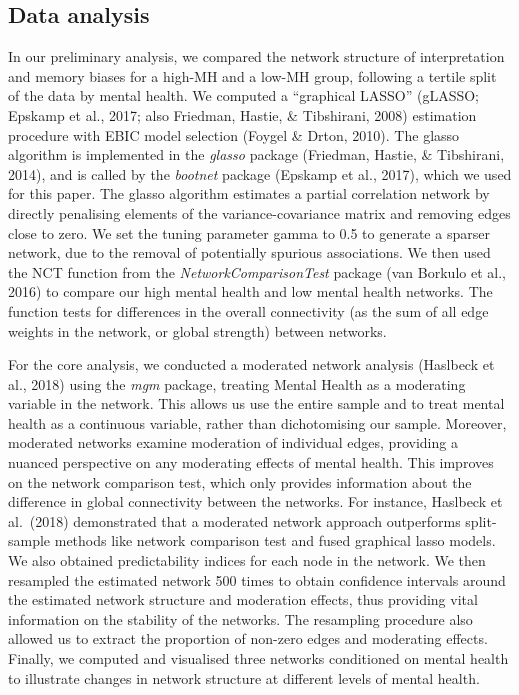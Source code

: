 \documentclass[man,floatsintext]{apa6}
\begin{document}
\hypertarget{data-analysis}{%
\subsection{Data analysis}\label{data-analysis}}

In our preliminary analysis, we compared the network structure of interpretation and memory biases for a high-MH and a low-MH group, following a tertile split of the data by mental health. We computed a \enquote{graphical LASSO} (gLASSO; Epskamp et al., 2017; also Friedman, Hastie, \& Tibshirani, 2008) estimation procedure with EBIC model selection (Foygel \& Drton, 2010). The glasso algorithm is implemented in the \emph{glasso} package (Friedman, Hastie, \& Tibshirani, 2014), and is called by the \emph{bootnet} package (Epskamp et al., 2017), which we used for this paper. The glasso algorithm estimates a partial correlation network by directly penalising elements of the variance-covariance matrix and removing edges close to zero. We set the tuning parameter gamma to 0.5 to generate a sparser network, due to the removal of potentially spurious associations. We then used the NCT function from the \emph{NetworkComparisonTest} package (van Borkulo et al., 2016) to compare our high mental health and low mental health networks. The function tests for differences in the overall connectivity (as the sum of all edge weights in the network, or global strength) between networks.

For the core analysis, we conducted a moderated network analysis (Haslbeck et al., 2018) using the \emph{mgm} package, treating Mental Health as a moderating variable in the network. This allows us use the entire sample and to treat mental health as a continuous variable, rather than dichotomising our sample. Moreover, moderated networks examine moderation of individual edges, providing a nuanced perspective on any moderating effects of mental health. This improves on the network comparison test, which only provides information about the difference in global connectivity between the networks. For instance, Haslbeck et al.~(2018) demonstrated that a moderated network approach outperforms split-sample methods like network comparison test and fused graphical lasso models. We also obtained predictability indices for each node in the network. We then resampled the estimated network 500 times to obtain confidence intervals around the estimated network structure and moderation effects, thus providing vital information on the stability of the networks. The resampling procedure also allowed us to extract the proportion of non-zero edges and moderating effects. Finally, we computed and visualised three networks conditioned on mental health to illustrate changes in network structure at different levels of mental health.
\end{document}
